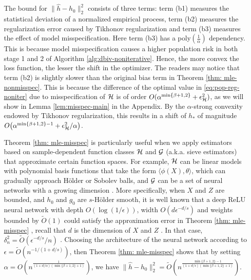The bound for $\|\hat{h} - h_0\|^2_2$ consists of three terms: term (b1) measures the statistical deviation of a normalized empirical process, term (b2) measures the regularization error caused by Tikhonov regularization and term (b3) measures the effect of model misspecification. Here term (b3) has a poly$(\frac{1}{\alpha})$ dependency. This is because model misspecification causes a higher population risk in both stage 1 and 2 of Algorithm \ref{alg:dbiv-noniterative}. Hence, the more convex the loss function, the lesser the shift in the optimizer. The readers may notice that term (b2) is slightly slower than the original bias term in Theorem \ref{thm: mle-nonmisspec}. This is because the difference of the optimal value in \eqref{eq:pop-reg-noniter} due to misspecification of $\mathcal{H}$ is of order $O(\alpha^{\min\{\beta+1,2\}}+ \epsilon_{\mathcal{H}}^2) $, as we will show in Lemma \ref{lem:misspec-main} in the Appendix. By the $\alpha$-strong convexity endowed by Tikhonov regularization, this results in a shift of $h_*$ of magnitude 
$O\big(\alpha^{\min\{\beta+1,2\}-1}+ \epsilon_{\mathcal{H}}^2/\alpha\big)$.


Theorem \ref{thm: mle-misspec} is particularly useful when we apply estimators based on sample-dependent function classes $\mathcal{H}$ and $\mathcal{G}$ (a.k.a. sieve estimators) that approximate certain function spaces. For example, $\mathcal{H}$ can be linear models with polynomial basis functions that take the form $\langle \phi(X), \theta\rangle$, which can gradually approach H\"{o}lder or Sobolev balls, and $\mathcal{G}$ can be a set of neural networks with a growing dimension \citep{chen2007large,chen2022nonparametric,schmidt2020nonparametric}. 
More specifically, when $X$ and $Z$ are bounded, and $h_0$ and $g_0$ are $s$-H{\"o}lder smooth, it is well known that a deep ReLU neural network with depth $O(\log(1/\epsilon))$, width $O(d\epsilon^{-d/s})$ and weights bounded by $\tilde{O}(1)$ could satisfy the approximation error in Theorem \ref{thm: mle-misspec} \citep{schmidt2019deep}, recall that $d$ is the dimension of $X$ and $Z$ . In that case, $\delta_n^2 = \tilde{O}(\epsilon^{-d/s}/n)$ \citep{bartlett2002localized, chen2022nonparametric}. Choosing the architecture of the neural network according to $\epsilon = \tilde{O}(n^{-1/(1+d/s)})$, then Theorem \ref{thm: mle-misspec} shows that by setting $\alpha = O(n^{\frac{1}{(1+d/\alpha)(\min\{\beta+1,2\}+1)}})$, we have $\|\hat{h} - h_0\|_2^2 = \tilde{O}(n^{\frac{\min\{\beta+1,2\}-1}{(1+d/s)(\min\{\beta+1,2\}+1)}})$.


